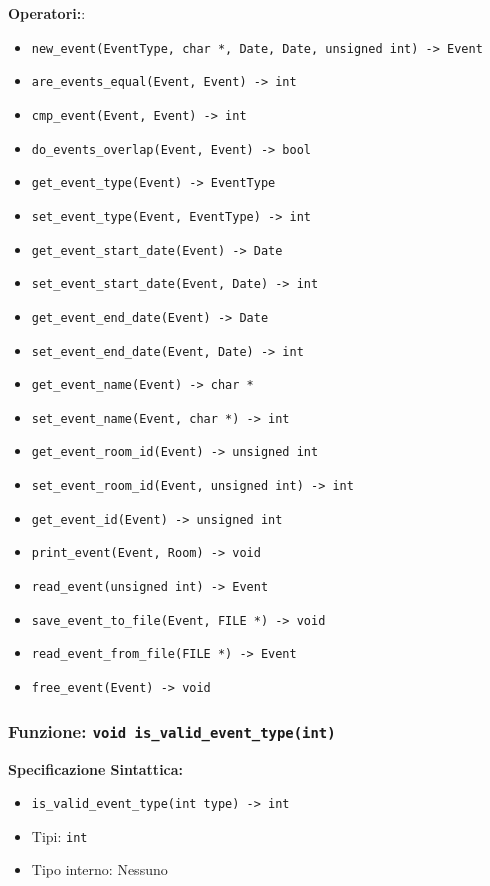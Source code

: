 \documentclass[11pt]{scrartcl} %
\begin{document}
\textbf{Operatori:}:
\begin{itemize}
\item \texttt{new\_event(EventType,  char *, Date, Date, unsigned int) -> Event}
\item \texttt{are\_events\_equal(Event, Event) -> int}
\item \texttt{cmp\_event(Event, Event) -> int}
\item \texttt{do\_events\_overlap(Event, Event) -> bool}
\item \texttt{get\_event\_type(Event) -> EventType}
\item \texttt{set\_event\_type(Event, EventType) -> int}
\item \texttt{get\_event\_start\_date(Event) -> Date}
\item \texttt{set\_event\_start\_date(Event, Date) -> int}
\item \texttt{get\_event\_end\_date(Event) -> Date}
\item \texttt{set\_event\_end\_date(Event, Date) -> int}
\item \texttt{get\_event\_name(Event) ->  char *}
\item \texttt{set\_event\_name(Event,  char *) -> int}
\item \texttt{get\_event\_room\_id(Event) -> unsigned int}
\item \texttt{set\_event\_room\_id(Event, unsigned int) -> int}
\item \texttt{get\_event\_id(Event) -> unsigned int}
\item \texttt{print\_event(Event, Room) -> void}
\item \texttt{read\_event(unsigned int) -> Event}
\item \texttt{save\_event\_to\_file(Event, FILE *) -> void}
\item \texttt{read\_event\_from\_file(FILE *) -> Event}
\item \texttt{free\_event(Event) -> void}
\end{itemize}



\subsubsection{Funzione: \texttt{void is\_valid\_event\_type(int)}}

\textbf{Specificazione Sintattica:}
\begin{itemize}
\item \texttt{is\_valid\_event\_type(int type) -> int}
\item Tipi: \texttt{int}
\item Tipo interno: Nessuno
\end{itemize}
\end{document}
